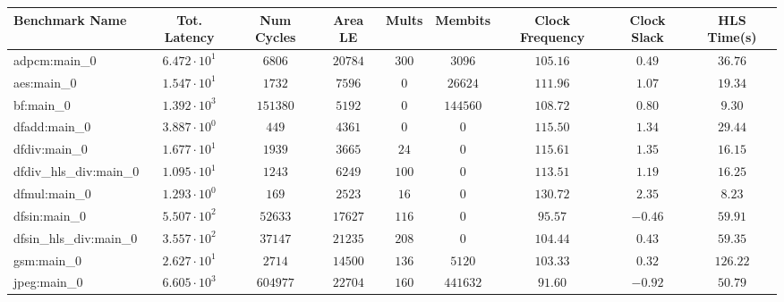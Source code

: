 \begin{tabular}{|l|c|c|c|c|c|c|c|c|}
\hline
Benchmark Name          & Tot. Latency           & Num Cycles & Area LE    & Mults    & Membits    & Clock Frequency & Clock Slack & HLS Time(s) \\
\hline
adpcm:main\_0           & $ 6.472 \cdot 10^{1} $ & $ 6806   $ & $ 20784  $ & $ 300  $ & $ 3096   $ & $ 105.16      $ & $ 0.49    $ & $ 36.76   $ \\
aes:main\_0             & $ 1.547 \cdot 10^{1} $ & $ 1732   $ & $ 7596   $ & $ 0    $ & $ 26624  $ & $ 111.96      $ & $ 1.07    $ & $ 19.34   $ \\
bf:main\_0              & $ 1.392 \cdot 10^{3} $ & $ 151380 $ & $ 5192   $ & $ 0    $ & $ 144560 $ & $ 108.72      $ & $ 0.80    $ & $ 9.30    $ \\
dfadd:main\_0           & $ 3.887 \cdot 10^{0} $ & $ 449    $ & $ 4361   $ & $ 0    $ & $ 0      $ & $ 115.50      $ & $ 1.34    $ & $ 29.44   $ \\
dfdiv:main\_0           & $ 1.677 \cdot 10^{1} $ & $ 1939   $ & $ 3665   $ & $ 24   $ & $ 0      $ & $ 115.61      $ & $ 1.35    $ & $ 16.15   $ \\
dfdiv\_hls\_div:main\_0 & $ 1.095 \cdot 10^{1} $ & $ 1243   $ & $ 6249   $ & $ 100  $ & $ 0      $ & $ 113.51      $ & $ 1.19    $ & $ 16.25   $ \\
dfmul:main\_0           & $ 1.293 \cdot 10^{0} $ & $ 169    $ & $ 2523   $ & $ 16   $ & $ 0      $ & $ 130.72      $ & $ 2.35    $ & $ 8.23    $ \\
dfsin:main\_0           & $ 5.507 \cdot 10^{2} $ & $ 52633  $ & $ 17627  $ & $ 116  $ & $ 0      $ & $ 95.57       $ & $ -0.46   $ & $ 59.91   $ \\
dfsin\_hls\_div:main\_0 & $ 3.557 \cdot 10^{2} $ & $ 37147  $ & $ 21235  $ & $ 208  $ & $ 0      $ & $ 104.44      $ & $ 0.43    $ & $ 59.35   $ \\
gsm:main\_0             & $ 2.627 \cdot 10^{1} $ & $ 2714   $ & $ 14500  $ & $ 136  $ & $ 5120   $ & $ 103.33      $ & $ 0.32    $ & $ 126.22  $ \\
jpeg:main\_0            & $ 6.605 \cdot 10^{3} $ & $ 604977 $ & $ 22704  $ & $ 160  $ & $ 441632 $ & $ 91.60       $ & $ -0.92   $ & $ 50.79   $ \\

\end{tabular}
